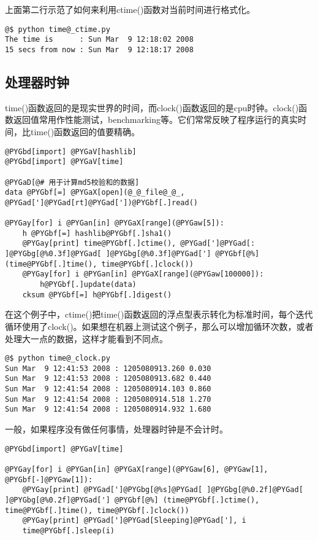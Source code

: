 \documentclass[letterpaper,10pt,english]{manual}
\begin{document}
上面第二行示范了如何来利用ctime()函数对当前时间进行格式化。

\begin{Verbatim}[commandchars=@\[\]]
@$ python time@_ctime.py
The time is      : Sun Mar  9 12:18:02 2008
15 secs from now : Sun Mar  9 12:18:17 2008
\end{Verbatim}


\subsection{处理器时钟}

time()函数返回的是现实世界的时间，而clock()函数返回的是cpu时钟。clock()函数返回值常用作性能测试，benchmarking等。它们常常反映了程序运行的真实时间，比time()函数返回的值要精确。

\begin{Verbatim}[commandchars=@\[\]]
@PYGbd[import] @PYGaV[hashlib]
@PYGbd[import] @PYGaV[time]

@PYGaD[@# 用于计算md5校验和的数据]
data @PYGbf[=] @PYGaX[open](@_@_file@_@_, @PYGad[']@PYGad[rt]@PYGad['])@PYGbf[.]read()

@PYGay[for] i @PYGan[in] @PYGaX[range](@PYGaw[5]):
    h @PYGbf[=] hashlib@PYGbf[.]sha1()
    @PYGay[print] time@PYGbf[.]ctime(), @PYGad[']@PYGad[: ]@PYGbg[@%0.3f]@PYGad[ ]@PYGbg[@%0.3f]@PYGad['] @PYGbf[@%] (time@PYGbf[.]time(), time@PYGbf[.]clock())
    @PYGay[for] i @PYGan[in] @PYGaX[range](@PYGaw[100000]):
        h@PYGbf[.]update(data)
    cksum @PYGbf[=] h@PYGbf[.]digest()
\end{Verbatim}

在这个例子中，ctime()把time()函数返回的浮点型表示转化为标准时间，每个迭代循环使用了clock()。如果想在机器上测试这个例子，那么可以增加循环次数，或者处理大一点的数据，这样才能看到不同点。

\begin{Verbatim}[commandchars=@\[\]]
@$ python time@_clock.py
Sun Mar  9 12:41:53 2008 : 1205080913.260 0.030
Sun Mar  9 12:41:53 2008 : 1205080913.682 0.440
Sun Mar  9 12:41:54 2008 : 1205080914.103 0.860
Sun Mar  9 12:41:54 2008 : 1205080914.518 1.270
Sun Mar  9 12:41:54 2008 : 1205080914.932 1.680
\end{Verbatim}

一般，如果程序没有做任何事情，处理器时钟是不会计时。

\begin{Verbatim}[commandchars=@\[\]]
@PYGbd[import] @PYGaV[time]

@PYGay[for] i @PYGan[in] @PYGaX[range](@PYGaw[6], @PYGaw[1], @PYGbf[-]@PYGaw[1]):
    @PYGay[print] @PYGad[']@PYGbg[@%s]@PYGad[ ]@PYGbg[@%0.2f]@PYGad[ ]@PYGbg[@%0.2f]@PYGad['] @PYGbf[@%] (time@PYGbf[.]ctime(), time@PYGbf[.]time(), time@PYGbf[.]clock())
    @PYGay[print] @PYGad[']@PYGad[Sleeping]@PYGad['], i
    time@PYGbf[.]sleep(i)
\end{Verbatim}
\end{document}
